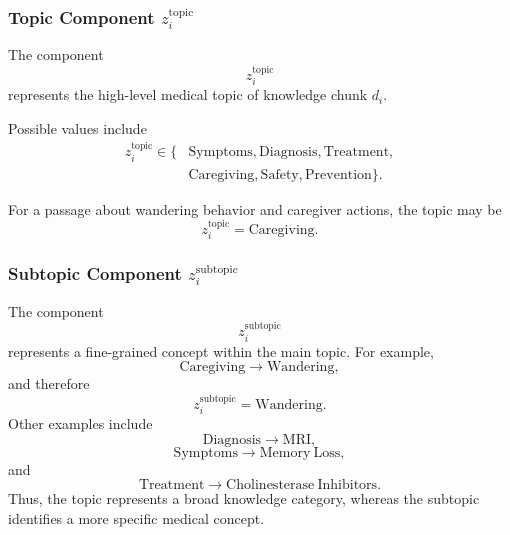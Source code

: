 \documentclass{article}
\begin{document}
\subsubsection{Topic Component $z_i^{\mathrm{topic}}$}
The component
\begin{equation}
    z_i^{\mathrm{topic}}
\end{equation}
represents the high-level medical topic of knowledge chunk $d_i$.

Possible values include
\begin{equation}
\begin{split}
    z_i^{\mathrm{topic}} \in
    \{&
    \mathrm{Symptoms},
    \mathrm{Diagnosis},
    \mathrm{Treatment},\\
    &\mathrm{Caregiving},
    \mathrm{Safety},
    \mathrm{Prevention}
    \}.
\end{split}
\end{equation}

For a passage about wandering behavior and caregiver actions, the topic may be
\begin{equation}
    z_i^{\mathrm{topic}} = \mathrm{Caregiving}.
\end{equation}

\subsubsection{Subtopic Component $z_i^{\mathrm{subtopic}}$}
The component
\begin{equation}
    z_i^{\mathrm{subtopic}}
\end{equation}
represents a fine-grained concept within the main topic. 
For example,
\begin{equation}
    \mathrm{Caregiving}
    \rightarrow
    \mathrm{Wandering},
\end{equation}
and therefore
\begin{equation}
    z_i^{\mathrm{subtopic}} = \mathrm{Wandering}.
\end{equation}
Other examples include
\begin{equation}
    \mathrm{Diagnosis}
    \rightarrow
    \mathrm{MRI},
\end{equation}
\begin{equation}
    \mathrm{Symptoms}
    \rightarrow
    \mathrm{Memory\ Loss},
\end{equation}
and
\begin{equation}
    \mathrm{Treatment}
    \rightarrow
    \mathrm{Cholinesterase\ Inhibitors}.
\end{equation}
Thus, the topic represents a broad knowledge category, whereas the subtopic identifies a more specific medical concept.
\end{document}
